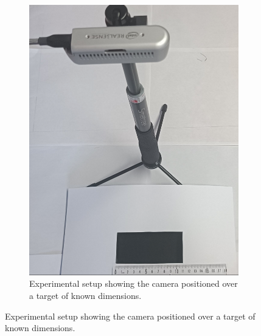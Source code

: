 \begin{figure}[h!]
    \centering
    \begin{subfigure}[b]{\textwidth}
        \centering
        \includegraphics[width=0.6\linewidth]{figures/volume_test_setup.png}
        \caption{Experimental setup showing the camera positioned over a target of known dimensions.}
        \label{fig:volume_test_setup_img}
    \end{subfigure}
    
    \vspace{0.5cm} %


\end{figure}
